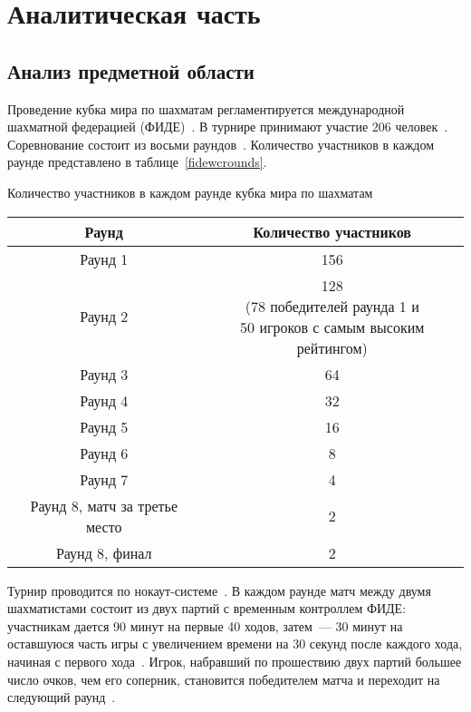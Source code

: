 \chapter{Аналитическая часть}

\section{Анализ предметной области}

Проведение кубка мира по шахматам регламентируется международной шахматной федерацией (ФИДЕ)~\cite{fidewc}. В турнире принимают участие 206 человек~\cite{fidewc}. Соревнование состоит из восьми раундов~\cite{fidewc}. Количество участников в каждом раунде представлено в таблице~\ref{fidewcrounds}.
\begin{center}
	\begin{threeparttable}
		\captionsetup{justification=raggedright,singlelinecheck=off}
		\caption{\label{fidewcrounds}Количество участников в каждом раунде кубка мира по шахматам}
		\centering
		\begin{tabular}{|c|c|}
			\hline
			Раунд & Количество участников \\
			\hline
			Раунд 1 & 156 \\
			\hline
			Раунд 2 & \specialcell{128\\(78 победителей раунда 1 и\\50 игроков с самым высоким рейтингом)} \\
			\hline
			Раунд 3 & 64 \\
			\hline
			Раунд 4 & 32 \\
			\hline
			Раунд 5 & 16 \\
			\hline
			Раунд 6 & 8 \\
			\hline
			Раунд 7 & 4 \\
			\hline
			Раунд 8, матч за третье место & 2 \\
			\hline
			Раунд 8, финал & 2 \\
			\hline
		\end{tabular}
	\end{threeparttable}
\end{center}

Турнир проводится по нокаут-системе~\cite{fidewc}. В каждом раунде матч между двумя шахматистами состоит из двух партий с временным контроллем ФИДЕ: участникам дается 90 минут на первые 40 ходов, затем~--- 30 минут на оставшуюся часть игры с увеличением времени на 30 секунд после каждого хода, начиная с первого хода~\cite{fidewc}. Игрок, набравший по прошествию двух партий большее число очков, чем его соперник, становится победителем матча и переходит на следующий раунд~\cite{fidewc}.


